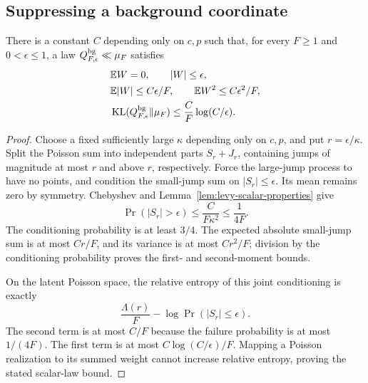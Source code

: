 \subsection{Suppressing a background coordinate}
\begin{lemma}
\label{lem:levy-background}
There is a constant $C$ depending only on $c,p$ such that, for every $F\ge1$ and $0<\epsilon\le1$, a law $Q_{F,\epsilon}^{\rm bg}\ll\mu_F$ satisfies
\begin{align*}
 &\mathbb E W=0,\qquad |W|\le\epsilon,\\
 &\mathbb E|W|\le C\epsilon/F,\qquad
   \mathbb E W^2\le C\epsilon^2/F,\\
 &\operatorname{KL}(Q_{F,\epsilon}^{\rm bg}\|\mu_F)
       \le\frac C F\log(C/\epsilon).
\end{align*}
\end{lemma}
\begin{proof}
Choose a fixed sufficiently large $\kappa$ depending only on $c,p$, and put $r=\epsilon/\kappa$. Split the Poisson sum into independent parts $S_r+J_r$, containing jumps of magnitude at most $r$ and above $r$, respectively. Force the large-jump process to have no points, and condition the small-jump sum on $|S_r|\le\epsilon$. Its mean remains zero by symmetry. Chebyshev and Lemma~\ref{lem:levy-scalar-properties} give
\[
 \Pr(|S_r|>\epsilon)
 \le\frac C{F\kappa^2}\le\frac1{4F}.
\]
The conditioning probability is at least $3/4$. The expected absolute small-jump sum is at most $Cr/F$, and its variance is at most $Cr^2/F$; division by the conditioning probability proves the first- and second-moment bounds.

On the latent Poisson space, the relative entropy of this joint conditioning is exactly
\[
 \frac{\Lambda(r)}F-
            \log\Pr(|S_r|\le\epsilon).
\]
The second term is at most $C/F$ because the failure probability is at most $1/(4F)$. The first term is at most $C\log(C/\epsilon)/F$. Mapping a Poisson realization to its summed weight cannot increase relative entropy, proving the stated scalar-law bound.
\end{proof}

